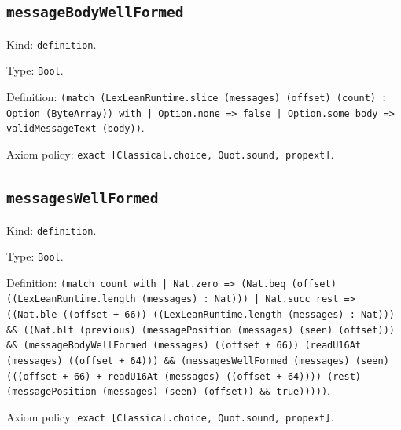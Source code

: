\documentclass[11pt]{article}
\begin{document}
\subsection*{\texttt{messageBodyWellFormed}}
\noindent Kind: \texttt{definition}.\par
\noindent Type: \texttt{Bool}.\par
\noindent Definition: \texttt{(match (LexLeanRuntime.slice (messages) (offset) (count) : Option (ByteArray)) with | Option.none => false | Option.some body => validMessageText (body))}.\par
\noindent Axiom policy: \texttt{exact [Classical.choice, Quot.sound, propext]}.\par
\subsection*{\texttt{messagesWellFormed}}
\noindent Kind: \texttt{definition}.\par
\noindent Type: \texttt{Bool}.\par
\noindent Definition: \texttt{(match count with | Nat.zero => (Nat.beq (offset) ((LexLeanRuntime.length (messages) : Nat))) | Nat.succ rest => ((Nat.ble ((offset + 66)) ((LexLeanRuntime.length (messages) : Nat))) \&\& ((Nat.blt (previous) (messagePosition (messages) (seen) (offset))) \&\& (messageBodyWellFormed (messages) ((offset + 66)) (readU16At (messages) ((offset + 64))) \&\& (messagesWellFormed (messages) (seen) (((offset + 66) + readU16At (messages) ((offset + 64)))) (rest) (messagePosition (messages) (seen) (offset)) \&\& true)))))}.\par
\noindent Axiom policy: \texttt{exact [Classical.choice, Quot.sound, propext]}.\par
\end{document}
